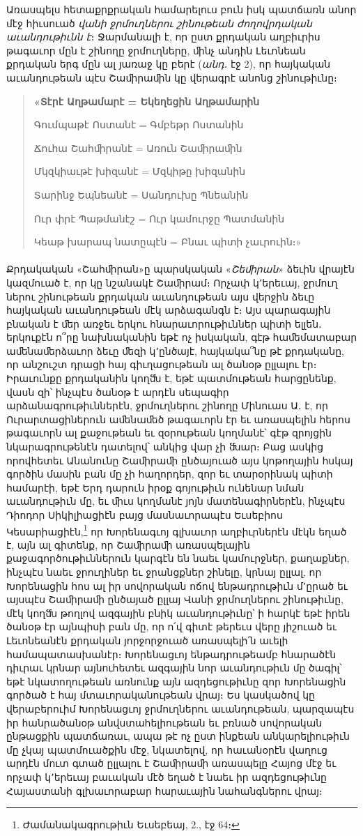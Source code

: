 \documentclass{article}
\begin{document}
{Առասպելս հետաքրքրական համարելուս բուն իսկ պատճառն անոր մէջ հիւսուած \emph{վանի ջրմուղներու շինութեան ժողովրդական աւանդութիւնն է}։ Ջարմանալի է, որ ըստ քրդական աղբիւրիս թագաւոր մըն է շինողը ջրմուղները, ﬕնչ անդին Լեւոնեան քրդական երգ մըն ալ յառաջ կը բերէ (\emph{անդ․} էջ 2), որ հայկական աւանդութեան պէս Շաﬕրաﬕն կը վերագրէ անոնց շինութիւնը։
\begin{quotation}
\arm
\bfseries
\normalsize
«Տէրէ Աղթամարէ = Եկեղեցին Աղթամարին

Գումպաթէ Ոստանէ = Գմբեթր Ոստանին

Ճուհա Շահﬕրանէ = Առուն Շաﬕրաﬕն

Մկզկիաւթէ խիզանէ = Մզկիթը խիզանին

Տարինջ Եպնեանէ = Սանդուխը Պնեանին

Ուր փրէ Պաթմանէշ = Ուր կամուրջը Պատմանին

Կեաթ խարապ նատըպէն = Բնաւ պիտի չաւրուին։»
\end{quotation}
\paragraph{}
Քրդակական «Շահﬕրան»ը պարսկական «\emph{Շեﬕրան}» ձեւին վրայէն կազմուած է, որ կը նշանակէ Շաﬕրամ։ Որչափ կ՚երեւայ, ջրմուղ ներու շինութեան քրդական աւանդութեան այս վերջին ձեւը հայկական աւանդութեան մէկ արձագանգն է։ Այս պարագային բնական է ﬔր առջեւ երկու հնարաւորութիւններ պիտի ելլեն․ երկուքէն ո՞րը նախնականին եթէ ոչ իսկական, գէթ հաﬔմատաբար աﬔնաﬔրձաւոր ձեւը ﬔզի կ՚ընծայէ, հայկակա՞նը թէ քրդականը, որ անշուշտ դրացի հայ գիւղացութեան ալ ծանօթ ըլլալու էր։ Իրաւունքը քրդականին կողﬓ է, եթէ պատմութեան հարցընենք, վասն զի՝ ինչպէս ծանօթ է արդէն սեպագիր արձանագրութիւններէն, ջրմուղներու շինողը Մինուաս Ա․ է, որ Ուրարտացիներուն աﬔնաﬔծ թագաւորն էր եւ առասպելին հերոս թագաւորն ալ քաջութեան եւ զօրութեան կողմանէ՝ գէթ զրոյցին նկարագրութենէն դատելով՝ անկից վար չի ﬓար։ Բաց ասկից որովհետեւ Անանունը Շաﬕրաﬕ ընծայուած այս կոթողային հսկայ գործին մասին բան մը չի հաղորդեր, զոր եւ տարօրինակ պիտի համարէի, եթէ Երդ դարուն իրօք գոյութիւն ունենար նման աւանդութիւն մը, եւ ﬕւս կողմանէ յոյն մատենագիրներէն, ինչպէս Դիոդոր Սիկիլիացիէն բայց մասնաւորապէս Եւսեբիոս Կեսարիացիէն,\footnote{Ժամանակագրութիւն Եւսեբեայ, 2., էջ 64։} որ Խորենագւոյ գլխաւոր աղբիւրներէն մէկն եղած է, այն ալ գիտենք, որ Շաﬕրաﬕ առասպելային քաջագործութիւններուն կարգէն են նաեւ կամուրջներ, քաղաքներ, ինչպէս նաեւ ջրուղիներ եւ ջրանցքներ շինելը, կրնայ ըլլալ, որ Խորենացին հոս ալ իր սովորական ոճով ենթադրութիւն մ՚ըրած եւ այսպէս Շաﬕրաﬕ ընծայած ըլլայ Վանի ջրմուղներու շինութիւնը, մէկ կողﬓ թողլով ազգային բնիկ աւանդութիւնը՝ ի հարկէ եթէ իրեն ծանօթ էր այնպիսի բան մը, որ ո՛վ գիտէ թերեւս վերը յիշուած եւ Լեւոնեանէն քրդական յորջորջուած առասպելի՛ն աւելի համապատասխանէր։ Խորենացւոյ ենթադրութեամբ հնարածէն դիւրաւ կրնար այնուհետեւ ազգային նոր աւանդութիւն մը ծագիլ՝ եթէ նկատողութեան առնունք այն ազդեցութիւնը զոր Խորենացին գործած է հայ մտաւորականութեան վրայ։ Ես կասկածով կը վերաբերուիմ Խորենացւոյ ջրմուղներու աւանդութեան, պարզապէս իր հանրածանօթ անվստահելիութեան եւ բռնած սովորական ընթացքին պատճառաւ, ապա թէ ոչ ըստ ինքեան անկարելիութիւն մը չկայ պատմուածքին մէջ, նկատելով, որ հաւանօրէն վաղուց արդէն մուտ գտած ըլլալու է Շաﬕրաﬕ առասպելը Հայոց մէջ եւ որչափ կ՚երեւայ բաւական մէծ եղած է նաեւ իր ազդեցութիւնը Հայաստանի գլխաւորաբար հարաւային նահանգներու վրայ։

}
\end{document}

